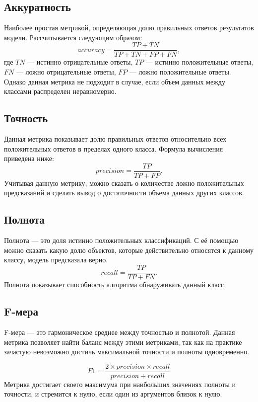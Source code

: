 \subsection{Аккуратность}
Наиболее простая метрикой, определяющая долю
правильных ответов результатов модели. Рассчитывается следующим образом:
\begin{equation}
    \label{eq:nn39}
    accuracy = \frac{TP + TN}{TP + TN + FP + FN},
\end{equation}
где $TN$ --- истинно отрицательные ответы, $TP$ --- истинно положительные ответы,
$FN$ --- ложно отрицательные ответы, $FP$ --- ложно положительные ответы. 
Однако данная метрика не подходит в случае, если объем данных между
классами распределен неравномерно.

\subsection{Точность}
Данная метрика показывает долю правильных ответов относительно
всех положительных ответов в пределах одного класса. Формула вычисления приведена ниже:
\begin{equation}
    \label{eq:nn40}
    precision = \frac{TP}{TP + FP}.
\end{equation}
Учитывая данную метрику, можно сказать о количестве ложно
положительных предсказаний и сделать вывод о достаточности объема данных
других классов.

\subsection{Полнота}
Полнота --- это доля истинно положительных классификаций. С её
помощью можно сказать какую долю объектов, которые действительно
относятся к данному классу, модель предсказала верно.
\begin{equation}
    \label{eq:nn41}
    recall = \frac{TP}{TP + FN}.
\end{equation}
Полнота показывает способность алгоритма обнаруживать данный класс.

\subsection{F-мера}
F-мера --- это гармоническое среднее между точностью и полнотой. Данная
метрика позволяет найти баланс между этими метриками, так как на практике
зачастую невозможно достичь максимальной точности и полноты одновременно.

\begin{equation}
    \label{eq:nn42}
    F1 = \frac{2 \times precision \times recall}{precision + recall}
\end{equation}
Метрика достигает своего максимума при наибольших значениях полноты
и точности, и стремится к нулю, если один из аргументов близок к нулю.


